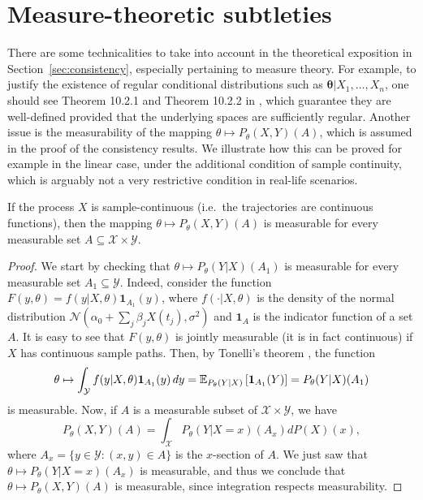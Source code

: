 \newpage
\section{Measure-theoretic subtleties}\label{app:measure-theory}

There are some technicalities to take into account in the theoretical exposition in Section~\ref{sec:consistency}, especially pertaining to measure theory. For example, to justify the existence of regular conditional distributions such as \(\bm\theta|X_1,\dots,X_n\), one should see Theorem 10.2.1 and Theorem 10.2.2 in \citet{dudley2002real}, which guarantee they are well-defined provided that the underlying spaces are sufficiently regular. Another issue is the measurability of the mapping \(\theta \mapsto P_\theta(X,Y)(A)\), which is assumed in the proof of the consistency results. We illustrate how this can be proved for example in the linear case, under the additional condition of sample continuity, which is arguably not a very restrictive condition in real-life scenarios.

\begin{proposition}
    If the process \(X\) is sample-continuous (i.e.\ the trajectories are continuous functions), then the mapping \(\theta \mapsto P_\theta(X,Y)(A)\) is measurable for every measurable set \(A \subseteq \mathcal X \times \mathcal Y\).
\end{proposition}

\begin{proof}
    We start by checking that \(\theta \mapsto P_\theta(Y|X)(A_1)\) is measurable for every measurable set \(A_1\subseteq \mathcal Y\). Indeed, consider the function \(F(y,\theta)=f(y|X,\theta)\bm{1}_{A_1}(y)\), where \(f(\cdot|X,\theta)\) is the density of the normal distribution \(\mathcal N(\alpha_0 + \sum_j \beta_j X(t_j), \sigma^2)\) and \(\bm{1}_A\) is the indicator function of a set \(A\). It is easy to see that \(F(y,\theta)\) is jointly measurable (it is in fact continuous) if \(X\) has continuous sample paths. Then, by Tonelli's theorem \citep[e.g.][Theorem~2.37]{folland1999real}, the function
    \[
        \theta \mapsto \int_{\mathcal Y} f(y|X,\theta)\bm{1}_{A_1}(y)\, dy = \mathbb{E}_{P_\theta(Y|X)}\left[\bm{1}_{A_1}(Y)\right] = P_\theta(Y|X)(A_1)
    \]
    is measurable. Now, if \(A\) is a measurable subset of \(\mathcal X \times \mathcal Y\), we have
    \[
        P_\theta(X,Y)(A)  = \int_{\mathcal X} P_\theta(Y|X=x)(A_x) dP(X)(x),
    \]
    where \(A_x=\{y\in\mathcal Y: (x,y) \in A\}\) is the \(x\)-section of \(A\). We just saw that \(\theta \mapsto P_\theta(Y|X=x)(A_x)\) is measurable, and thus we conclude that \(\theta \mapsto P_\theta(X,Y)(A)\) is measurable, since integration respects measurability.
\end{proof}

